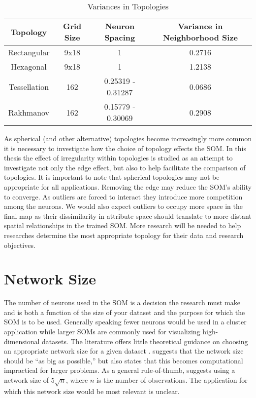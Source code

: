 \begin{table}[htbp]
\caption{Variances in Topologies}
\begin{center}
\begin{tabular}{|c|c|c|c|}
\hline
Topology&Grid Size&Neuron Spacing&Variance in Neighborhood Size\\
\hline
Rectangular&9x18&1&0.2716\\
Hexagonal&9x18&1&1.2138\\
Tessellation&162&0.25319 - 0.31287& 0.0686\\
Rakhmanov&162&0.15779 - 0.30069& 0.2908\\
\hline
\end{tabular}
\end{center}
\label{table1}
\end{table}

As spherical (and other alternative) topologies become
increasingly more common it is necessary to investigate how the choice of
topology effects the SOM.  In this thesis the effect of irregularity within
topologies is studied as an attempt to investigate not only the edge effect,
but also to help facilitate the comparison of topologies.  It is important to
note that spherical topologies may not be appropriate for all applications.
Removing the edge may reduce the SOM's ability to converge.  As outliers are
forced to interact they introduce more competition among the neurons.  We
would also expect outliers to occupy more space in the final map as their
dissimilarity in attribute space should translate to more distant spatial
relationships in the trained SOM.  More research will be needed to help researches
determine the most appropriate topology for their data and research objectives.

\section{Network Size}
The number of neurons used in the SOM is a decision the research must make and
is both a function of the size of your dataset and the purpose for which the
SOM is to be used.  Generally speaking fewer neurons would be used in a
cluster application while larger SOMs are commonly used for visualizing
high-dimensional datasets.  The literature offers little theoretical guidance
on choosing an appropriate network size for a given dataset \citep{cho1996}.
\cite{toolbox} suggests that the network size should be ``as big as
possible,'' but also states that this becomes computational impractical for
larger problems. As a general rule-of-thumb, \citeauthor{toolbox} suggests using a
network size of \(5\sqrt {n}\), where \(n\) is the number of observations. The
application for which this network size would be most relevant is unclear.  


